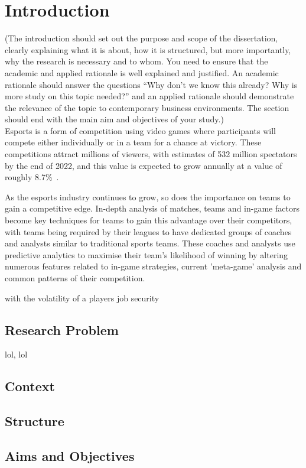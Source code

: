\chapter{Introduction}\label{ch:introduction}

(The introduction should set out the purpose and scope of the dissertation, clearly explaining what it is about, how it is structured, but more importantly, why the research is necessary and to whom.
You need to ensure that the academic and applied rationale is well explained and justified.
An academic rationale should answer the questions “Why don’t we know this already?
Why is more study on this topic needed?” and an applied rationale should demonstrate the relevance of the topic to contemporary business environments.
The section should end with the main aim and objectives of your study.) \\

Esports is a form of competition using video games where participants will compete either individually or in a team for a chance at victory.
These competitions attract millions of viewers, with estimates of 532 million spectators by the end of 2022, and this value is expected to grow annually at a value of roughly 8.7\%~\citep{newzoo2022viewers}.


As the esports industry continues to grow, so does the importance on teams to gain a competitive edge.
In-depth analysis of matches, teams and in-game factors become key techniques for teams to gain this advantage over their competitors, with teams being required by their leagues to have dedicated groups of coaches and analysts similar to traditional sports teams\citep{LCSRules}.
These coaches and analysts use predictive analytics to maximise their team's likelihood of winning by altering numerous features related to in-game strategies, current 'meta-game' analysis and common patterns of their competition\citep{kokkinakis2021metagaming}.


with the volatility of a players job security\citep{ward2019esport}


\section{Research Problem}\label{sec:Research Problem}
\ac{lol}, \ac{lol}
\lipsum[1-5]

\section{Context}\label{sec:Context}
\lipsum[1-5]

\section{Structure}\label{sec:Structure}
\lipsum[1-5]

\section{Aims and Objectives}\label{sec:Aims and Objectives}
\lipsum[1-5]